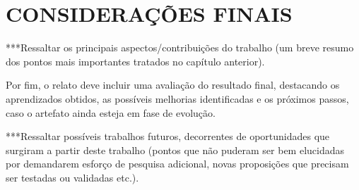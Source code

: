 \section{CONSIDERAÇÕES FINAIS}

***Ressaltar os principais aspectos/contribuições do trabalho (um breve resumo dos pontos mais importantes tratados no capítulo anterior).

Por fim, o relato deve incluir uma avaliação do resultado final, destacando os aprendizados obtidos, as possíveis melhorias identificadas e os próximos passos, caso o artefato ainda esteja em fase de evolução.

***Ressaltar possíveis trabalhos futuros, decorrentes de oportunidades que surgiram a partir deste trabalho (pontos que não puderam ser bem elucidadas por demandarem esforço de pesquisa adicional, novas proposições que precisam ser testadas ou validadas etc.).
